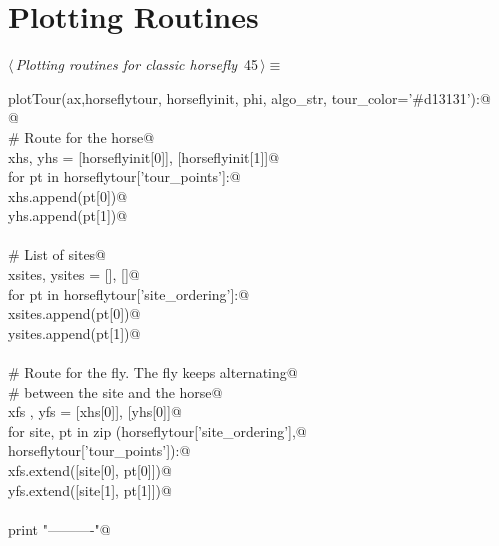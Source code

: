 \documentclass[11.5pt]{report}
\begin{document}
\section{Plotting Routines}
\newchunk 
\begin{flushleft} \small\label{scrap54}\raggedright\small
{} $\langle\,${\itshape Plotting routines for classic horsefly}\nobreak\ {\footnotesize {45}}$\,\rangle\equiv$
\vspace{-1ex}
\begin{list}{}{} \item
\mbox{}\verb@def plotTour(ax,horseflytour, horseflyinit, phi, algo_str, tour_color='#d13131'):@\\
\mbox{}\verb@   @\\
\mbox{}\verb@    # Route for the horse@\\
\mbox{}\verb@    xhs, yhs = [horseflyinit[0]], [horseflyinit[1]]@\\
\mbox{}\verb@    for pt in horseflytour['tour_points']:@\\
\mbox{}\verb@        xhs.append(pt[0])@\\
\mbox{}\verb@        yhs.append(pt[1])@\\
\mbox{}\verb@@\\
\mbox{}\verb@    # List of sites@\\
\mbox{}\verb@    xsites, ysites = [], []@\\
\mbox{}\verb@    for pt in horseflytour['site_ordering']:@\\
\mbox{}\verb@        xsites.append(pt[0])@\\
\mbox{}\verb@        ysites.append(pt[1])@\\
\mbox{}\verb@@\\
\mbox{}\verb@    # Route for the fly. The fly keeps alternating@\\
\mbox{}\verb@    # between the site and the horse@\\
\mbox{}\verb@    xfs , yfs = [xhs[0]], [yhs[0]]@\\
\mbox{}\verb@    for site, pt in zip (horseflytour['site_ordering'],@\\
\mbox{}\verb@                         horseflytour['tour_points']):@\\
\mbox{}\verb@        xfs.extend([site[0], pt[0]])@\\
\mbox{}\verb@        yfs.extend([site[1], pt[1]])@\\
\mbox{}\verb@@\\
\mbox{}\verb@    print "\n----------"@\\

\end{list}
\end{flushleft}
\end{document}
